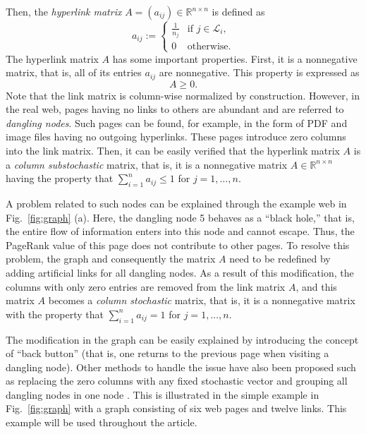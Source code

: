 \documentclass[11pt,draftcls,onecolumn]{IEEEtran}
\newcommand{\field}[1]{{\mathbb{#1}}}
\newcommand{\R}{\field{R}}
\begin{document}
Then, the {\it hyperlink matrix} $A=(a_{ij})\in\R^{n\times n}$ is defined as
\begin{equation}
 a_{ij} 
  := \begin{cases}
      \frac{1}{n_j} & \text{if $j\in \mathcal{L}_i$},\\
      0             & \text{otherwise}.
    \end{cases}
 \label{eqn:A}
\end{equation}
The hyperlink matrix $A$ has some important properties. First, it is a nonnegative matrix, 
that is, all of its entries  $a_{ij}$ are nonnegative. This property is expressed as
$$
A\geq 0.
$$
Note that the link matrix is column-wise normalized by construction. 
However, in the real web, pages having no links to others are abundant and
are referred to {\it dangling nodes}. 
Such pages can be found, for example, in the form of PDF and image files
having no outgoing hyperlinks. These pages introduce zero columns into the link matrix. 
Then, it can be easily verified that the 
hyperlink matrix $A$ is a {\it column substochastic} matrix, that is, 
it is a nonnegative matrix $A\in \R^{n\times n}$ having  
the property that $\sum_{i=1}^n a_{ij} \le1$ for $j=1,\ldots,n$.

A problem related to such nodes can be explained through 
the example web in Fig.~\ref{fig:graph} (a). Here, the dangling node 5 behaves as a ``black hole,''
that is, the entire flow of information enters into this node and cannot escape.
Thus, the PageRank value of this page does not contribute to other pages.
To resolve this problem, the graph and consequently the matrix $A$
need to be redefined by adding artificial links for 
all dangling nodes. As a result of this modification, the columns with only zero entries 
are removed from the link matrix $A$, and this matrix $A$ becomes a {\it column stochastic} matrix, 
that is, it is a nonnegative matrix 
with the property that $\sum_{i=1}^n a_{ij}=1$ for $j=1,\ldots,n$.

The modification in the graph can be easily explained by introducing the concept of ``back button''
(that is, one returns to the previous page when visiting a dangling node).
Other methods to handle the issue have also been proposed such as replacing the zero columns
with any fixed stochastic vector and grouping all dangling nodes in one node \cite{LanMey:06,IpsSel:07}.
This is illustrated in the simple example in Fig.~\ref{fig:graph}
with a graph consisting of six web pages and twelve links. 
This example will be used throughout the article.
\end{document}
